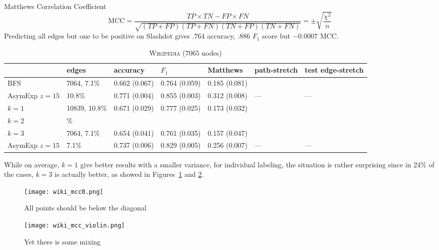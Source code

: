 \documentclass[a4paper,final,notitlepage,11pt,svgnames]{scrartcl}
\begin{document}
Matthews Correlation Coefficient \[
	\text{MCC} = \frac{ TP \times TN - FP \times FN } {\sqrt{ (TP + FP) ( TP + FN ) (
			TN + FP ) ( TN + FN ) } } = \pm \sqrt{\frac{\chi^2}{n}}
\]
Predicting all edges but one to be positive on Slashdot gives $.764$ accuracy,
$.886$ $F_1$ score but $-0.0007$ MCC.

\begin{table}[htpb]
	\centering
	\caption{\textsc{Wikipedia} ($7065$ nodes) \label{tab:wiki}}
	\begin{tabular}{lllllll}
		\toprule
		         & edges         & accuracy      & $F_1$         & Matthews      & path-stretch & test edge-stretch \\
		\midrule
		BFS      & 7064, 7.1\%   & 0.662 (0.067) & 0.764 (0.059) & 0.185 (0.081) &              & \\
		AsymExp $z=15$ & 10.8\%  & 0.771 (0.004) & 0.855 (0.003) & 0.312 (0.008) & ---          & --- \\
		$k=1$    & 10839, 10.8\% & 0.671 (0.029) & 0.777 (0.025) & 0.173 (0.032) &              & \\
		$k=2$    & \%            &               &               &               &              & \\
		$k=3$    & 7064, 7.1\%   & 0.654 (0.041) & 0.761 (0.035) & 0.157 (0.047) &              & \\
		AsymExp $z=15$ & 7.1\%   & 0.737 (0.006) & 0.829 (0.005) & 0.256 (0.007) & ---          & --- \\
		\bottomrule
	\end{tabular}
\end{table}

While on average, $k=1$ give better results with a smaller variance, for
individual labeling, the situation is rather surprising since in 24\% of the
cases, $k=3$ is actually better, as showed in Figures~\ref{fig:mcc0} and
\ref{fig:violin}.

\begin{figure}[htpb]
	\centering
	\texttt{[image: wiki\_mcc0.png]}
	\caption{All points should be below the diagonal \label{fig:mcc0}}
\end{figure}

\begin{figure}[htpb]
	\centering
	\texttt{[image: wiki\_mcc\_violin.png]}
	\caption{Yet there is some mixing \label{fig:violin}}
\end{figure}
\end{document}

